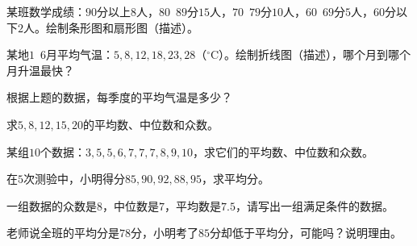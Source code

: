 \documentclass[a4paper,12pt]{ctexart}
\begin{document}



\begin{exercise}
\item 某班数学成绩：$90$分以上$8$人，$80$~$89$分$15$人，$70$~$79$分$10$人，$60$~$69$分$5$人，$60$分以下$2$人。绘制条形图和扇形图（描述）。
\item 某地$1$~$6$月平均气温：$5,8,12,18,23,28$（$^\circ$C）。绘制折线图（描述），哪个月到哪个月升温最快？
\item 根据上题的数据，每季度的平均气温是多少？
\end{exercise}

\newpage







\begin{exercise}
\item 求$5,8,12,15,20$的平均数、中位数和众数。
\item 某组$10$个数据：$3,5,5,6,7,7,7,8,9,10$，求它们的平均数、中位数和众数。
\item 在$5$次测验中，小明得分$85,90,92,88,95$，求平均分。
\item 一组数据的众数是$8$，中位数是$7$，平均数是$7.5$，请写出一组满足条件的数据。
\item 老师说全班的平均分是$78$分，小明考了$85$分却低于平均分，可能吗？说明理由。
\end{exercise}

\newpage

\end{document}
